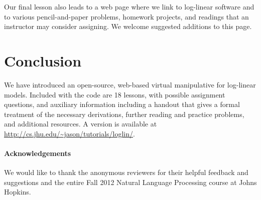 \documentclass[11pt,letterpaper]{article}
\newcommand{\Note}[1]{}
\renewcommand{\Note}[1]{\hl{[#1]}}  %
\newcommand{\NoteSigned}[3]{{\sethlcolor{#2}\Note{#1: #3}}}
\newcommand{\NoteFF}[1]{\NoteSigned{FF}{LightBlue}{#1}}
\newcommand{\WhereToFind}[0]{\url{http://cs.jhu.edu/~jason/tutorials/loglin/}}
\newcommand{\NumLessons}[0]{18}%
\begin{document}


Our final lesson also leads to a web page where we link to log-linear
software and to various pencil-and-paper problems, homework projects,
and readings that an instructor may consider assigning.  We welcome
suggested additions to this page.


\section{Conclusion}
We have introduced an open-source, web-based virtual manipulative for
log-linear models. Included with the code are
\NumLessons{} lessons, with possible assignment questions, and auxiliary 
information including a handout that gives a formal treatment of the necessary 
derivations, further reading and practice problems, and additional resources.
A version is available at \WhereToFind{}.


\paragraph*{Acknowledgements}
We would like to thank the anonymous reviewers for their helpful feedback and suggestions 
and the entire Fall 2012 Natural Language Processing course at 
Johns Hopkins.




\end{document}
